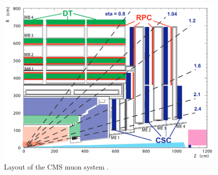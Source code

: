 \begin{figure}[hbtp]
\centering
\includegraphics[scale=0.4]{figures/lhc_and_cms/muon_system_layout.png}
\caption{Layout of the CMS muon system \cite{cms_tdr_v1}.}
\label{muon_system_layout}
\end{figure}